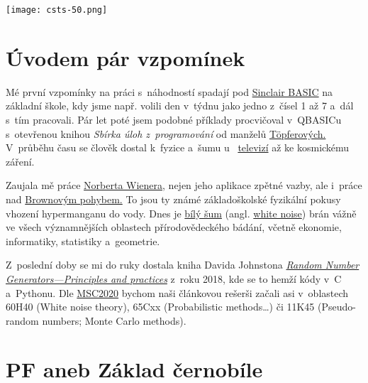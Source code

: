 \noindent
\texttt{[image: csts-50.png]}





%

\newpage

\section{Úvodem pár vzpomínek}

Mé první vzpomínky na práci s~náhodností spadají pod 
\href{https://cs.wikipedia.org/wiki/Sinclair_BASIC}{Sinclair BASIC} na základní škole, kdy jsme např. volili den v~týdnu jako jedno z~čísel 1 až 7 a~dál s~tím pracovali. Pár let poté jsem podobné příklady procvičoval v~QBASICu s~otevřenou knihou 
\textit{Sbírka úloh z~programování} od manželů 
\href{https://ksvi.mff.cuni.cz/~topfer/}{Töpferových.}
%
V~průběhu času se člověk dostal k~fyzice a~šumu u~%
\href{https://thebookofshaders.com/edit.php?log=161119150756}{televizí} až ke kosmickému záření. 
\smallskip

\noindent
{}%
\smallskip

Zaujala mě práce 
\href{https://cs.wikipedia.org/wiki/Norbert_Wiener}{Norberta Wienera,} 
nejen jeho aplikace zpětné vazby, ale i~práce nad 
\href{https://cs.wikipedia.org/wiki/Brown%C5%AFv_pohyb}{Brownovým pohybem.} 
To jsou ty známé základoškolské fyzikální pokusy vhození hypermanganu do vody.
%
Dnes je 
\href{https://cs.wikipedia.org/wiki/B%C3%ADl%C3%BD_%C5%A1um}{bílý šum} (angl. 
\href{https://en.wikipedia.org/wiki/White_noise}{white noise}) brán vážně ve všech významnějších oblastech přírodovědeckého bádání, včetně ekonomie, informatiky, statistiky a~geometrie.

Z~poslední doby se mi do ruky dostala kniha Davida Johnstona 
\href{https://www.amazon.com/Random-Number-Generators-Principles-Practice-Programmers/dp/1501515136}{\textit{Random Number Generators---Principles and practices}} z~roku 2018, kde se to hemží kódy v~C a~Pythonu. Dle \href{https://msc2020.org}{MSC2020} bychom naši článkovou rešerši začali asi v~oblastech 60H40 (White noise theory), 65Cxx (Probabilistic methods\ldots) či 11K45 (Pseudo-random numbers; Monte Carlo methods).


\section{PF aneb Základ černobíle}

